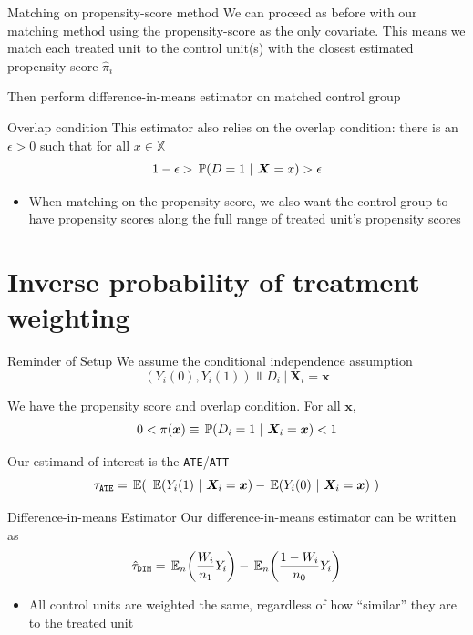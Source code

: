 \documentclass[aspectratio=169,t,11pt,table]{beamer}
\begin{document}
\begin{frame}{Matching on propensity-score method}
  We can proceed as before with our matching method using the propensity-score as the only covariate. This means we match each treated unit to the control unit(s) with the closest estimated propensity score $\hat{\pi}_i$

  \bigskip
  Then perform difference-in-means estimator on matched control group
\end{frame}

\begin{frame}{Overlap condition}
  This estimator also relies on the overlap condition: there is an $\epsilon > 0$ such that for all $x \in \mathbb{X}$
  $$
    1 - \epsilon > \prob{D = 1}{\bm{X} = x} > \epsilon
  $$
  \begin{itemize}
    \item When matching on the propensity score, we also want the control group to have propensity scores along the full range of treated unit's propensity scores
  \end{itemize}
\end{frame}

\section{Inverse probability of treatment weighting}

\begin{frame}{Reminder of Setup}
  We assume the conditional independence assumption
  $$
    (Y_{i}(0), Y_{i}(1)) \Perp D_i \ \vert \ \bm{X}_i = \bm{x}
  $$

  We have the propensity score and overlap condition. For all $\bm{x}$,
  $$
    0 < \pi(\bm{x}) \equiv \prob{D_i = 1}{\bm{X}_i = \bm{x}} < 1
  $$

  Our estimand of interest is the \texttt{ATE}/\texttt{ATT}
  $$
    \tau_{\texttt{ATE}} = \expec{\ \expec{Y_i(1)}{\bm{X}_i = \bm{x}} - \expec{Y_i(0)}{\bm{X}_i = \bm{x}} \ }
  $$
\end{frame}

\begin{frame}{Difference-in-means Estimator}
  Our difference-in-means estimator can be written as 
  $$
    \hat{\tau}_{\texttt{DIM}} = \expec[n]{\frac{W_i}{n_1} Y_i} - \expec[n]{\frac{1 - W_i}{n_0} Y_i}
  $$
  \begin{itemize}
    \item All control units are weighted the same, regardless of how ``similar'' they are to the treated unit
  \end{itemize}
\end{frame}
\end{document}
